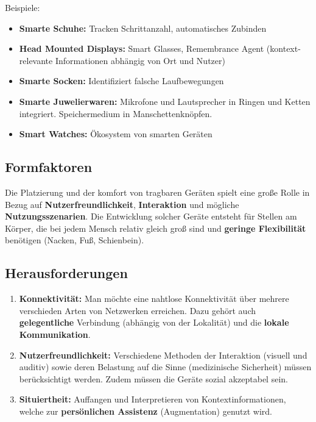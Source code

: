 \documentclass[a4paper]{article}
\begin{document}
Beispiele:
\begin{itemize}
	\item \textbf{Smarte Schuhe:} Tracken Schrittanzahl, automatisches Zubinden
	\item \textbf{Head Mounted Displays:}  Smart Glasses, Remembrance Agent (kontext-relevante Informationen abhängig von Ort und Nutzer)
	\item \textbf{Smarte Socken:} Identifiziert falsche Laufbewegungen
	\item \textbf{Smarte Juwelierwaren:} Mikrofone und Lautsprecher in Ringen und Ketten integriert. Speichermedium in Manschettenknöpfen.
	\item \textbf{Smart Watches:} Ökosystem von smarten Geräten
\end{itemize}
\subsection{Formfaktoren}
Die Platzierung und der komfort von tragbaren Geräten spielt eine große Rolle in Bezug auf \textbf{Nutzerfreundlichkeit}, \textbf{Interaktion} und mögliche \textbf{Nutzungsszenarien}. Die Entwicklung solcher Geräte entsteht für Stellen am Körper, die bei jedem Mensch relativ gleich groß sind und \textbf{geringe Flexibilität} benötigen (Nacken, Fuß, Schienbein).
\subsection{Herausforderungen}
\begin{enumerate}
	\item \textbf{Konnektivität:} Man möchte eine nahtlose Konnektivität über mehrere verschieden Arten von Netzwerken erreichen. Dazu gehört auch \textbf{gelegentliche} Verbindung (abhängig von der Lokalität) und die \textbf{lokale Kommunikation}.
	\item \textbf{Nutzerfreundlichkeit:} Verschiedene Methoden der Interaktion (visuell und auditiv) sowie deren Belastung auf die Sinne (medizinische Sicherheit) müssen berücksichtigt werden. Zudem müssen die Geräte sozial akzeptabel sein.
	\item \textbf{Situiertheit:} Auffangen und Interpretieren von Kontextinformationen, welche zur \textbf{persönlichen Assistenz} (Augmentation) genutzt wird.
\end{enumerate}

\newpage
\end{document}
